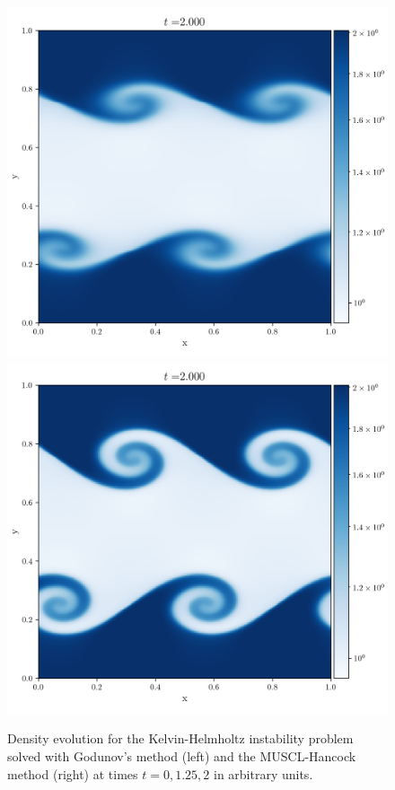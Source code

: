 \begin{figure}
\\
\includegraphics[width=.5\linewidth]{figures/FV/godunov_euler/kelvin-helmholtz-0400.png}%
\includegraphics[width=.5\linewidth]{figures/FV/MUSCL-Hancock/kelvin-helmholtz-0400.png}%
\caption[Kelvin-Helmholtz Instability with Godunov's scheme and MUSCL-Hancock 1]{
Density evolution for the Kelvin-Helmholtz instability problem solved with Godunov's method (left)
and the MUSCL-Hancock method (right) at times $t = 0, 1.25, 2$ in arbitrary units.
}
\label{fig:kelvin-helmholtz-1}
\end{figure}



